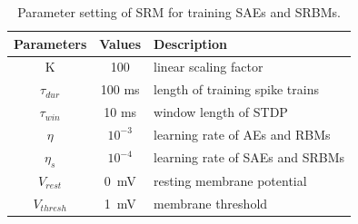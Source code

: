 \begin{table}[hbbp]
	\centering
	\caption{\label{tbl:srm}Parameter setting of SRM for training SAEs and SRBMs.}
	\bgroup
	\def\arraystretch{1}
	\begin{tabular}{c c l}
		Parameters & Values & Description \\
		\hline
		K & 100 & linear scaling factor\\
		$\tau_{dur}$ & 100 ms &  length of training spike trains\\
		$\tau_{win}$ & 10 ms & window length of STDP\\
		$\eta$ & $10^{-3}$ & learning rate of AEs and RBMs\\
		$\eta_s$ & $10^{-4}$ & learning rate of SAEs and SRBMs\\
		$V_{rest}$ & 0~mV & resting membrane potential\\
		$V_{thresh}$ & 1~mV & membrane threshold  \\
	\end{tabular}
	\egroup
\end{table}



